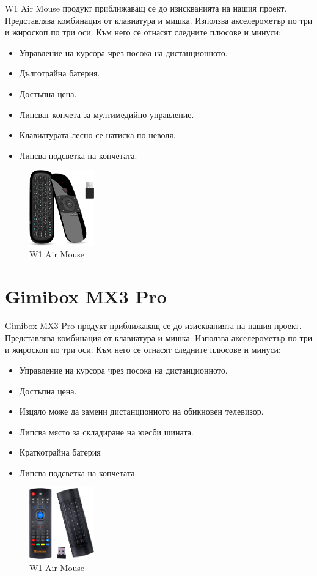 \documentclass[a4paper,14pt]{extreport}
\newcommand\pro{\item[$+$]}
\newcommand\con{\item[$-$]}
\begin{document}
W1 Air Mouse продукт приближаващ се до изискванията на нашия проект. Представлява комбинация от
клавиатура и мишка. Използва акселерометър по три и жироскоп по три оси. Към него се отнасят
следните плюсове и минуси:

\begin{itemize}
	\pro Управление на курсора чрез посока на дистанционното.
	\pro Дълготрайна батерия.
	\pro Достъпна цена.
	\con Липсват копчета за мултимедийно управление.
	\con Клавиатурата лесно се натиска по неволя.
	\con Липсва подсветка на копчетата.
\end{itemize}

\begin{figure}[h]
	\centering
	\includegraphics[width=0.25\textwidth]{w1-air-mouse}
	\caption{W1 Air Mouse}
\end{figure}

\section{Gimibox MX3 Pro}
Gimibox MX3 Pro продукт приближаващ се до изискванията на нашия проект. Представлява комбинация от
клавиатура и мишка. Използва акселерометър по три и жироскоп по три оси. Към него се отнасят
следните плюсове и минуси:
\begin{itemize}
	\pro Управление на курсора чрез посока на дистанционното.
	\pro Достъпна цена.
	\pro Изцяло може да замени дистанционното на обикновен телевизор.
	\con Липсва място за складиране на юесби шината.
	\con Краткотрайна батерия
	\con Липсва подсветка на копчетата.
\end{itemize}

\begin{figure}[h]
	\centering
	\includegraphics[width=0.25\textwidth]{gimbox-mx3-pro}
	\caption{W1 Air Mouse}
\end{figure}
\end{document}
